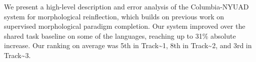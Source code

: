 We present a high-level description and error analysis of the Columbia-NYUAD system for morphological reinflection, which builds on previous work on supervised morphological paradigm completion. Our system improved over the shared task baseline on some of the languages, reaching up to 31\% absolute increase.  Our ranking on average was 5th in Track{\textasciitilde}1, 8th in Track{\textasciitilde}2, and 3rd in Track{\textasciitilde}3.
